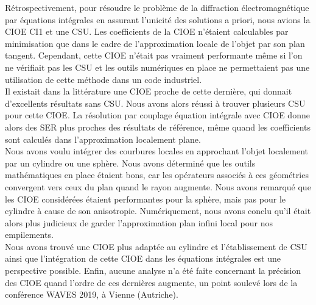 
Rétrospectivement, pour résoudre le problème de la diffraction électromagnétique par équations intégrales en assurant l'unicité des solutions a priori, nous avions la CIOE CI1 et une CSU.
Les coefficients de la CIOE n'étaient calculables par minimisation que dans le cadre de l'approximation locale de l'objet par son plan tangent.
Cependant, cette CIOE n'était pas vraiment performante même si l’on ne vérifiait pas les CSU et les outils numériques en place ne permettaient pas une utilisation de cette méthode dans un code industriel.
\\

Il existait dans la littérature une CIOE proche de cette dernière, qui donnait d'excellents résultats sans CSU.
Nous avons alors réussi à trouver plusieurs CSU pour cette CIOE.
La résolution par couplage équation intégrale avec CIOE donne alors des SER plus proches des résultats de référence, même quand les coefficients sont calculés dans l'approximation localement plane.
\\

Nous avons voulu intégrer des courbures locales en approchant l'objet localement par un cylindre ou une sphère.
Nous avons déterminé que les outils mathématiques en place étaient bons, car les opérateurs associés à ces géométries convergent vers ceux du plan quand le rayon augmente.
Nous avons remarqué que les CIOE considérées étaient performantes pour la sphère, mais pas pour le cylindre à cause de son anisotropie.
Numériquement, nous avons conclu qu'il était alors plus judicieux de garder l’approximation plan infini local pour nos empilements.
\\

Nous avons trouvé une CIOE plus adaptée au cylindre et l'établissement de CSU ainsi que l'intégration de cette CIOE dans les équations intégrales est une perspective possible.
Enfin, aucune analyse n'a été faite concernant la précision des CIOE quand l'ordre de ces dernières augmente, un point soulevé lors de la conférence WAVES 2019, à Vienne (Autriche).
